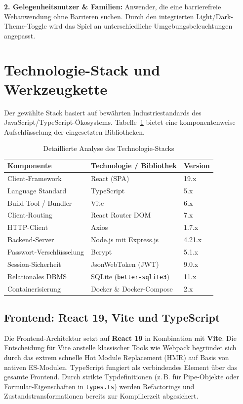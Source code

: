 \documentclass[12pt,a4paper]{article}
\begin{document}
\textbf{2. Gelegenheitsnutzer \& Familien:}
Anwender, die eine barrierefreie Webanwendung ohne Barrieren suchen. Durch den integrierten Light/Dark-Theme-Toggle wird das Spiel an unterschiedliche Umgebungsbeleuchtungen angepasst.

\section{Technologie-Stack und Werkzeugkette}

Der gewählte Stack basiert auf bewährten Industriestandards des JavaScript/TypeScript-Ökosystems. Tabelle~\ref{tab:tech-stack-detail} bietet eine komponentenweise Aufschlüsselung der eingesetzten Bibliotheken.

\begin{table}[htbp]
  \centering
  \begin{tabularx}{\textwidth}{lXl}
    \toprule
    \textbf{Komponente} & \textbf{Technologie / Bibliothek} & \textbf{Version} \\ \midrule
    Client-Framework & React (SPA) & 19.x \\
    Language Standard & TypeScript & 5.x \\
    Build Tool / Bundler & Vite & 6.x \\
    Client-Routing & React Router DOM & 7.x \\
    HTTP-Client & Axios & 1.7.x \\
    Backend-Server & Node.js mit Express.js & 4.21.x \\
    Passwort-Verschlüsselung & Bcrypt & 5.1.x \\
    Session-Sicherheit & JsonWebToken (JWT) & 9.0.x \\
    Relationales DBMS & SQLite (\texttt{better-sqlite3}) & 11.x \\
    Containerisierung & Docker \& Docker-Compose & 2.x \\ \bottomrule
  \end{tabularx}
  \caption{Detaillierte Analyse des Technologie-Stacks}
  \label{tab:tech-stack-detail}
\end{table}

\subsection{Frontend: React 19, Vite und TypeScript}
Die Frontend-Architektur setzt auf \textbf{React 19} in Kombination mit \textbf{Vite}. Die Entscheidung für Vite anstelle klassischer Tools wie Webpack begründet sich durch das extrem schnelle Hot Module Replacement (HMR) auf Basis von nativen ES-Modulen. TypeScript fungiert als verbindendes Element über das gesamte Frontend. Durch strikte Typdefinitionen (z.\,B. für Pipe-Objekte oder Formular-Eigenschaften in \texttt{types.ts}) werden Refactorings und Zustandstransformationen bereits zur Kompilierzeit abgesichert.
\end{document}
